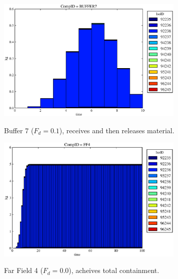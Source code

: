 \begin{frame}
\begin{figure}
\begin{minipage}[b]{0.45\linewidth}
  \includegraphics[width=0.8\textwidth]{./images/drIV3.eps}
  \caption[Case DRIV Buffer Contaminants]{
    Buffer 7 ($F_d=0.1$), receives and then releases material.
    }
  \label{fig:drIVbuff}
  \includegraphics[width=0.8\textwidth]{./images/drIV0.eps}
  \caption[Case DRIV FF Contaminants.]{ 
    Far Field 4 ($F_d = 0.0$), acheives total containment.
    }
  \label{fig:drIVff0}


  \end{minipage}
\end{figure}
\end{frame}
